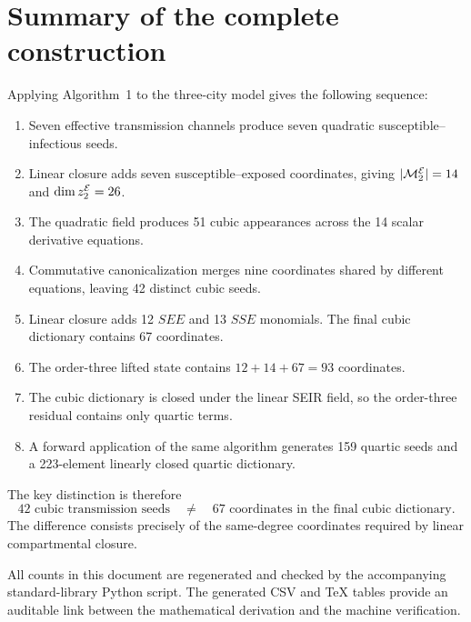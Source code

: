 \section{Summary of the complete construction}
\label{sec:summary}

Applying Algorithm~1 to the three-city model gives the following sequence:

\begin{enumerate}[leftmargin=2em,label=\arabic*.]
\item Seven effective transmission channels produce seven quadratic
      susceptible--infectious seeds.
\item Linear closure adds seven susceptible--exposed coordinates, giving
      $|\mathcal M_2^{\mathcal{E}}|=14$ and $\dim z_2^{\mathcal{E}}=26$.
\item The quadratic field produces 51 cubic appearances across the 14 scalar
      derivative equations.
\item Commutative canonicalization merges nine coordinates shared by different
      equations, leaving 42 distinct cubic seeds.
\item Linear closure adds 12 $SEE$ and 13 $SSE$ monomials. The final cubic
      dictionary contains 67 coordinates.
\item The order-three lifted state contains $12+14+67=93$ coordinates.
\item The cubic dictionary is closed under the linear SEIR field, so the
      order-three residual contains only quartic terms.
\item A forward application of the same algorithm generates 159 quartic seeds
      and a 223-element linearly closed quartic dictionary.
\end{enumerate}

The key distinction is therefore
\[
\boxed{
42\text{ cubic transmission seeds}
\quad\neq\quad
67\text{ coordinates in the final cubic dictionary}.
}
\]
The difference consists precisely of the same-degree coordinates required by
linear compartmental closure.

All counts in this document are regenerated and checked by the accompanying
standard-library Python script. The generated CSV and TeX tables provide an
auditable link between the mathematical derivation and the machine
verification.
